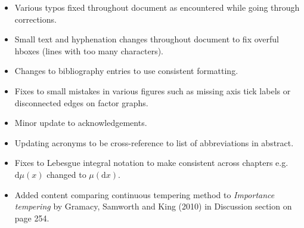 \documentclass[10pt,a4paper]{article}
\begin{document}
\begin{itemize}
  \item Various typos fixed throughout document as encountered while going through corrections.
  \item Small text and hyphenation changes throughout document to fix overful hboxes (lines with too many characters).
  \item Changes to bibliography entries to use consistent formatting.
  \item Fixes to small mistakes in various figures such as missing axis tick labels or disconnected edges on factor graphs.
  \item Minor update to acknowledgements.
  \item Updating acronyms to be cross-reference to list of abbreviations in abstract.
  \item Fixes to Lebesgue integral notation to make consistent across chapters e.g. $\mathrm{d}\mu(x)$ changed to $\mu(\mathrm{d}x)$.
  \item Added content comparing continuous tempering method to \emph{Importance tempering} by Gramacy, Samworth and King (2010) in Discussion section on page 254.
\end{itemize}
\end{document}
